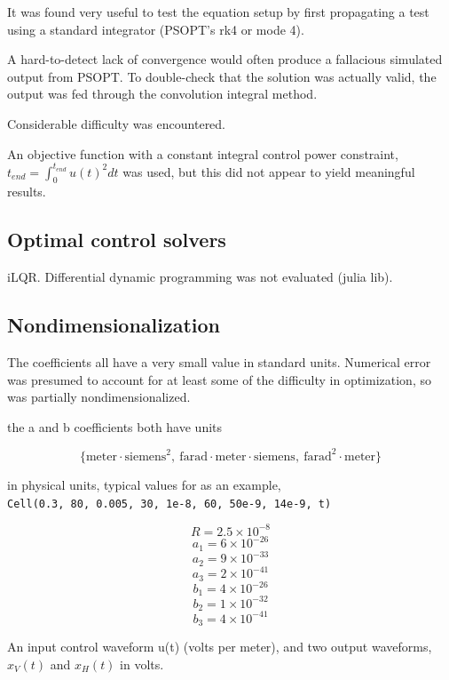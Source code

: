 \documentclass[fleqn,10pt]{paper}
\begin{document}
It was found very useful to test the equation setup by first propagating a test using a standard integrator (PSOPT's rk4 or mode 4).

A hard-to-detect lack of convergence would often produce a fallacious simulated output from PSOPT. To double-check that the solution was actually valid, the output was fed through the convolution integral method.

Considerable difficulty was encountered. 

An objective function with a constant integral control power constraint, $t_{end} = \int_0^{t_{end}} u(t)^2 dt$ was used, but this did not appear to yield meaningful results.

\subsection*{Optimal control solvers}





iLQR. Differential dynamic programming was not evaluated (julia lib).




\subsection*{Nondimensionalization}

The coefficients all have a very small value in standard units. Numerical error was presumed to account for at least some of the difficulty in optimization, so was partially nondimensionalized. 

the a and b coefficients both have units     

\[ \{\text{meter}\cdot \text{siemens}^2, \  \text{farad}\cdot \text{meter}\cdot \text{siemens} ,\ \text{farad}^2 \cdot \text{meter}\} \]

in physical units, typical values for as an example, \\
\verb|Cell(0.3, 80, 0.005, 30, 1e-8, 60, 50e-9, 14e-9, t)| \

$$R = 2.5\times10^{-8}$$
$$a_1 = 6\times10^{-26}$$
$$a_2 = 9\times10^{-33}$$
$$a_3 = 2\times10^{-41}$$
$$b_1 = 4\times10^{-26}$$
$$b_2 = 1\times10^{-32}$$
$$b_3 = 4\times10^{-41}$$

An input control waveform u(t) (volts per meter), and two output waveforms, $x_V(t)$ and $x_H(t)$ in volts.\\
\end{document}
